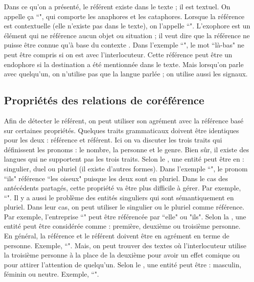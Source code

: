 \documentclass{KodeBook}
\begin{document}
Dans ce qu'on a présenté, le référent existe dans le texte ; il est textuel. 
On appelle ça ``", qui comporte les anaphores et les cataphores. 
Lorsque la référence est contextuelle (elle n'existe pas dans le texte), on l'appelle ``".
L'exophore est un élément qui ne référence aucun objet ou situation ; il veut dire que la référence ne puisse être connue qu'à base du contexte \cite{2014-halliday-hasan}. 
Dans l'exemple ``", le mot ``là-bas" ne peut être compris si on est avec l'interlocuteur. 
Cette référence peut être un endophore si la destination a été mentionnée dans le texte. 
Mais lorsqu'on parle avec quelqu'un, on n'utilise pas que la langue parlée ; on utilise aussi les signaux.

\subsection{Propriétés des relations de coréférence}

Afin de détecter le référent, on peut utiliser son agrément avec la référence basé sur certaines propriétés. 
Quelques traits grammaticaux doivent être identiques pour les deux : référence et référent. 
Ici on va discuter les trois traits qui définissent les pronoms : le nombre, la personne et le genre.
Bien sûr, il existe des langues qui ne supportent pas les trois traits. 
Selon le , une entité peut être en : singulier, duel ou pluriel (il existe d'autres formes). 
Dans l'exemple ``", le pronom ``ils" référence ``les oiseux" puisque les deux sont en pluriel. 
Dans le cas des antécédents partagés, cette propriété va être plus difficile à gérer.
Par exemple, ``".
Il y a aussi le problème des entités singuliers qui sont sémantiquement en pluriel. 
Dans leur cas, on peut utiliser le singulier ou le pluriel comme référence. 
Par exemple, l'entreprise ``" peut être référencée par ``elle" ou "ils".
%
Selon la , une entité peut être considérée comme : première, deuxième ou troisième personne. 
En général, la référence et le référent doivent être en agrément en terme de personne.
Exemple,  ``".
Mais, on peut trouver des textes où l'interlocuteur utilise la troisième personne à la place de la deuxième pour avoir un effet comique ou pour attirer l'attention de quelqu'un.
%
Selon le , une entité peut être : masculin, féminin ou neutre. 
Exemple, ``".
\end{document}
